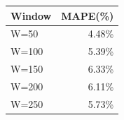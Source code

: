 {\tiny\setlength{\tabcolsep}{2pt}\begin{tabular}{lr} \toprule
Window & MAPE(\%) \\ \midrule
W=50 & 4.48\% \\ 
W=100 & 5.39\% \\ 
W=150 & 6.33\% \\ 
W=200 & 6.11\% \\ 
W=250 & 5.73\% \\ 
\bottomrule \end{tabular}}